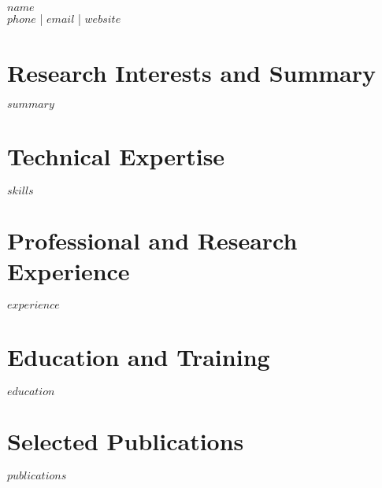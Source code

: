 \documentclass[11pt,a4paper]{article}
\begin{document}
\begin{center}
\textbf{\Large $name$}\\[0.3em]
$phone$ | $email$ | $website$
\end{center}

\section{Research Interests and Summary}
$summary$

\section{Technical Expertise}
$skills$

\section{Professional and Research Experience}
$experience$

\section{Education and Training}
$education$

\section{Selected Publications}
$publications$
\end{document}
